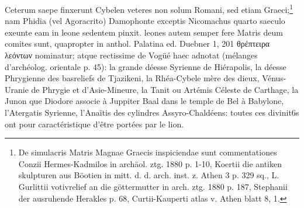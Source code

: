\documentclass[a4paper, 11pt, oneside, polutonikogreek, german]{article}
\begin{document}
Ceterum saepe finxerunt Cybelen veteres non solum Romani, sed etiam Graeci;\footnote{De simulacris Matris Magnae Graecis inspiciendae sunt commentationes Conzii Hermes-Kadmilos in archäol. ztg. 1880 p. 1-10, Koertii die antiken skulpturen aus Böotien in mitt. d. d. arch. inst. z. Athen 3 p. 329 sq., L. Gurlittii votivrelief an die göttermutter in arch. ztg. 1880 p. 187, Stephanii der ausruhende Herakles p. 68, Curtii-Kauperti atlas v. Athen blatt 8, 1.} nam Phidia (vel Agoracrito) Damophonte exceptis Nicomachus quarto saeculo exeunte eam in leone sedentem pinxit. leones autem semper fere Matris deum comites sunt, quapropter in anthol. Palatina ed. Duebner 1, 201 θρέπτειρα λεόντων nominatur; atque rectissime de Vogüé haec adnotat (mélanges d'archéolog. orientale p. 45): la grande déesse Syrienne de Hiérapolis, la déesse Phrygienne des basreliefs de Tjazikeni, la Rhéa-Cybele mère des dieux, Vénus-Uranie de Phrygie et d'Asie-Mineure, la Tanit ou Artémis Céleste de Carthage, la Junon que Diodore associe à Juppiter Baal dans le temple de Bel à Babylone, l'Atergatis Syrienne, l'Anaïtis des cylindres Assyro-Chaldéens: toutes ces divinit6s ont pour caractéristique d'être portées par le lion.
\end{document}
